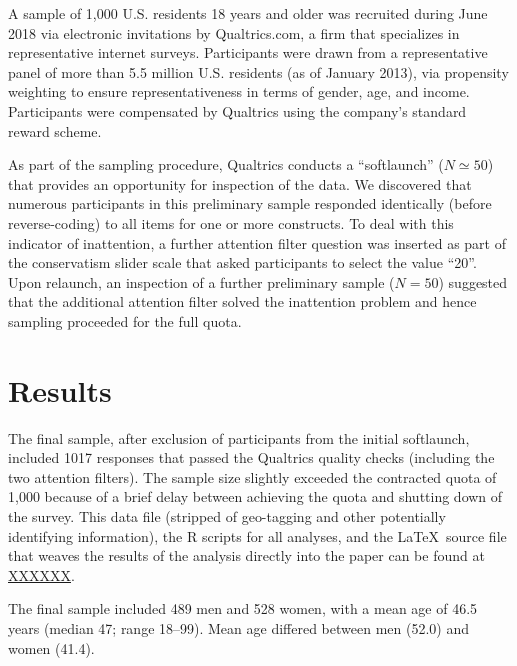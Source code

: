 \documentclass[fignum,man]{apa}\usepackage[]{graphicx}\usepackage[]{color}
\begin{document}
A sample of 1,000 U.S. residents 18 years and older was recruited during June 2018
via electronic invitations by Qualtrics.com, a firm that
specializes in representative internet surveys. 
Participants were
drawn from a representative panel of more than 5.5 million
U.S. residents (as of January 2013), via propensity weighting to
ensure representativeness in terms of gender, age, and income.
Participants were compensated by Qualtrics using the company's
standard reward scheme.

As part of the sampling procedure, Qualtrics conducts a
``softlaunch'' ($N \simeq 50$) that provides an opportunity for
inspection of the data. We discovered that numerous participants 
in this preliminary sample 
responded identically (before reverse-coding)
to all items for one or more constructs. 
To deal with this indicator
of inattention, a further attention filter question was
inserted as part of the conservatism slider scale that asked
participants to select the value ``20''. Upon relaunch, 
an inspection of a further preliminary sample ($N=50$) suggested
that the additional attention filter
solved the inattention problem and hence sampling proceeded
for the full quota.

\section{Results}
The final sample, after exclusion of participants from 
the initial softlaunch, included 1017 responses that passed the Qualtrics
quality checks (including the two attention filters). The sample size
slightly exceeded the contracted quota of 1,000 because of a brief delay
between achieving the quota and shutting down of the survey.
This data file (stripped of geo-tagging and other potentially identifying 
information), 
the R scripts for all analyses, and the \LaTeX ~source file 
that weaves the results of the analysis directly into the paper can be found 
at \url{XXXXXX}. 


The final sample included 489 men and 528 women, with a mean age of 
46.5 years
 (median 47;
range 18--99). 
Mean age differed between men (52.0) and women (41.4). 
\end{document}
